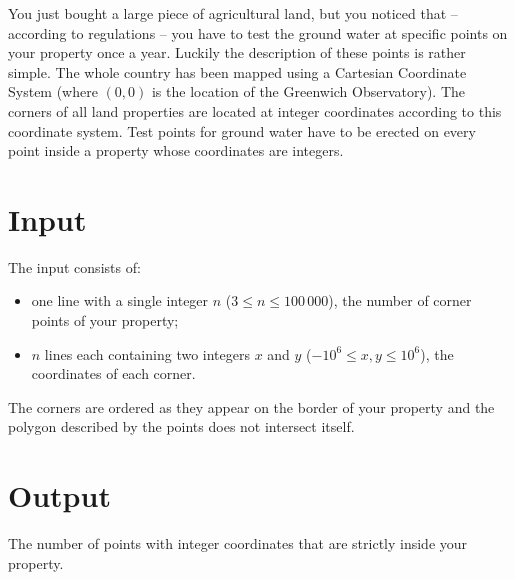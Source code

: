 You just bought a large piece of agricultural land, but you noticed that -- according to regulations -- you have to test the ground water at specific points on your property once a year.
Luckily the description of these points is rather simple.
The whole country has been mapped using a Cartesian Coordinate System (where $(0,0)$ is the location of the Greenwich Observatory).
The corners of all land properties are located at integer coordinates according to this coordinate system.
Test points for ground water have to be erected on every point inside a property whose coordinates are integers.

\section*{Input}
The input consists of:
\begin{itemize}
	\item one line with a single integer $n$ ($3 \leq n \leq 100\,000$), the number of corner points of your property;
	\item $n$ lines each containing two integers $x$ and $y$ ($-10^6 \leq x,y \leq 10^6$), the coordinates of each corner.
\end{itemize}

The corners are ordered as they appear on the border of your property and the polygon described by the points does not intersect itself.

%

\section*{Output}
The number of points with integer coordinates that are strictly inside your property.
